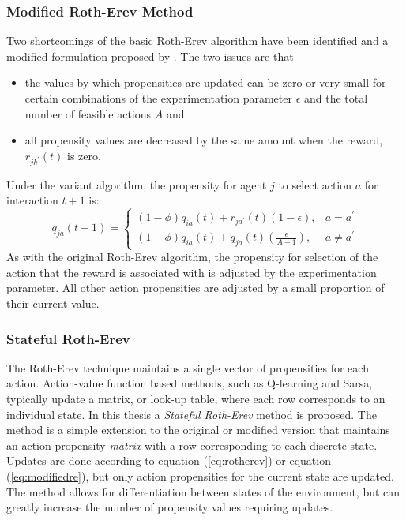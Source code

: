 \subsubsection{Modified Roth-Erev Method}
\label{sec:variant}
Two shortcomings of the basic Roth-Erev algorithm have been identified and a
modified formulation proposed by .  The two issues are
that
\begin{itemize}
  \item the values by which propensities are updated can be zero or very small
  for certain combinations of the experimentation parameter $\epsilon$ and
  the total number of feasible actions $A$ and
  \item all propensity values are decreased by the same amount when the reward,
  $r_{jk^\prime}(t)$ is zero.
\end{itemize}
Under the variant algorithm, the propensity for agent $j$ to select action $a$
for interaction $t+1$ is:
\begin{equation}
\label{eq:modifiedre}
q_{ja}(t+1) =
\begin{cases}
(1-\phi)q_{ia}(t) + r_{ja^\prime}(t)(1-\epsilon), & \text{$a = a^\prime$} \\
(1-\phi)q_{ia}(t) + q_{ja}(t)(\frac{\epsilon}{A-1}), & \text{$a \ne
a^\prime$}
\end{cases}
\end{equation}
As with the original Roth-Erev algorithm, the propensity for selection of the
action that the reward is associated with is adjusted by the experimentation
parameter.  All other action propensities are adjusted by a small proportion of
their current value.

\subsubsection{Stateful Roth-Erev}
\label{sec:stateful}
The Roth-Erev technique maintains a single vector of propensities for each
action.  Action-value function based methods, such as Q-learning and Sarsa,
typically update a matrix, or look-up table, where each row corresponds to an
individual state.  In this thesis a \textit{Stateful Roth-Erev} method is
proposed.  The method is a simple extension to the original or modified version
that maintains an action propensity \textit{matrix} with a row corresponding to
each discrete state.  Updates are done according to equation (\ref{eq:rotherev})
or equation (\ref{eq:modifiedre}), but only action propensities for the current
state are updated. The method allows for differentiation between states of the
environment, but can greatly increase the number of propensity values
requiring updates.

